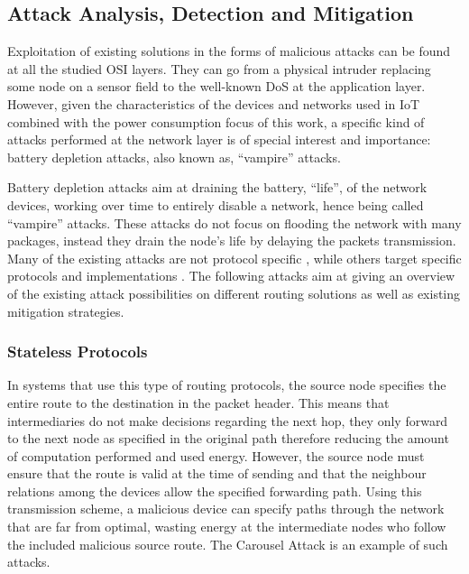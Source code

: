 \documentclass{sig-alternate-05-2015}
\begin{document}
\subsection{Attack Analysis, Detection and Mitigation}
\label{sec:attack_analysis}
Exploitation of existing solutions in the forms of malicious attacks can be found at all the studied OSI layers. They can go from a physical intruder replacing some node on a sensor field to the well-known \gls{DoS} at the application layer. However, given the characteristics of the devices and networks used in \gls{IoT} combined with the power consumption focus of this work, a specific kind of attacks performed at the network layer is of special interest and importance: battery depletion attacks, also known as, ``vampire'' attacks.

Battery depletion attacks aim at draining the battery, ``life'', of the network devices, working over time to entirely disable a network, hence being called ``vampire'' attacks. These attacks do not focus on flooding the network with many packages, instead they drain the node's life by delaying the packets transmission. Many of the existing attacks are not protocol specific \cite{Vasserman2013}, while others target specific protocols and implementations \cite{Pongle2015}. The following attacks aim at giving an overview of the existing attack possibilities on different routing solutions as well as existing mitigation strategies. 

\subsubsection{Stateless Protocols}
\label{sec:source_routing}

In systems that use this type of routing protocols, the source node specifies the entire route to the destination in the packet header. This means that intermediaries do not make decisions regarding the next hop, they only forward to the next node as specified in the original path therefore reducing the amount of computation performed and used energy. However, the source node must ensure that the route is valid at the time of sending and that the neighbour relations among the devices allow the specified forwarding path. Using this transmission scheme, a malicious device can specify paths through the network that are far from optimal, wasting energy at the intermediate nodes who follow the included malicious source route. The Carousel Attack is an example of such attacks.\\
\end{document}
